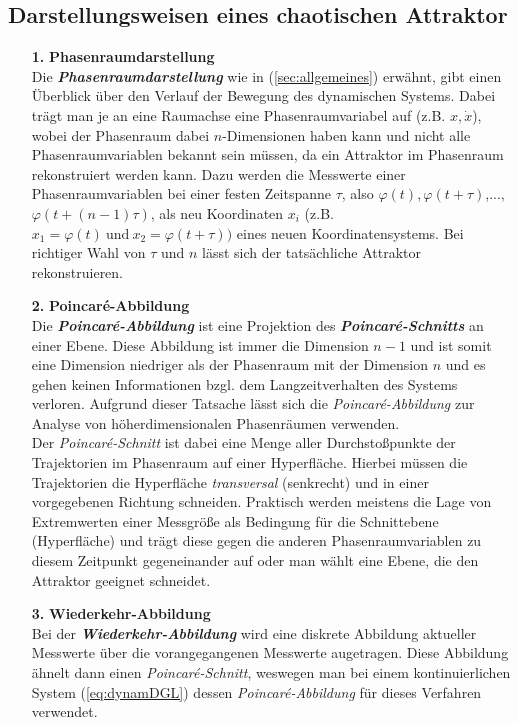 \subsection{Darstellungsweisen eines chaotischen Attraktor}
\label{sub:darstellungAttraktor}
\begin{itemize}
    \item[\textbf{1.}]{\textbf{Phasenraumdarstellung}}\\
    Die \textit{\textbf{Phasenraumdarstellung}} wie in (\ref{sec:allgemeines}) erwähnt, gibt einen Überblick über den Verlauf der Bewegung des dynamischen Systems. Dabei trägt man je an eine Raumachse eine Phasenraumvariabel auf (z.B. $x, \dot{x}$), wobei der Phasenraum dabei $n$-Dimensionen haben kann und nicht alle Phasenraumvariablen bekannt sein müssen, da ein Attraktor im Phasenraum rekonstruiert werden kann. Dazu werden die Messwerte einer Phasenraumvariablen bei einer festen Zeitspanne $\tau$, also $\varphi(t), \varphi(t+\tau)$,..., $\varphi(t+(n-1)\tau)$, als neu Koordinaten $x_i$ (z.B. $x_1=\varphi(t)~\text{und}~x_2=\varphi(t+\tau))$ eines neuen Koordinatensystems. Bei richtiger Wahl von $\tau$ und $n$ lässt sich der tatsächliche Attraktor rekonstruieren. \citep{Lueck}
    \item[\textbf{2.}]{\textbf{Poincar\'e-Abbildung}}\\
    Die \textit{\textbf{Poincar\'e-Abbildung}} ist eine Projektion des \textit{\textbf{Poincar\'e-Schnitts}} an einer Ebene. Diese Abbildung ist immer die Dimension $n-1$ und ist somit eine Dimension niedriger als der Phasenraum mit der Dimension $n$ und es gehen keinen Informationen bzgl. dem Langzeitverhalten des Systems verloren. Aufgrund dieser Tatsache lässt sich die \textit{Poincar\'e-Abbildung} zur Analyse von höherdimensionalen Phasenräumen verwenden.\\
    Der \textit{Poincar\'e-Schnitt} ist dabei eine Menge aller Durchstoßpunkte der Trajektorien im Phasenraum auf einer Hyperfläche. Hierbei müssen die Trajektorien die Hyperfläche \textit{transversal} (senkrecht) und in einer vorgegebenen Richtung schneiden. Praktisch werden meistens die Lage von Extremwerten einer Messgröße als Bedingung für die Schnittebene (Hyperfläche) und trägt diese gegen die anderen Phasenraumvariablen zu diesem Zeitpunkt gegeneinander auf oder man wählt eine Ebene, die den Attraktor geeignet schneidet. \citep{Lueck}
    \item[\textbf{3.}]{\textbf{Wiederkehr-Abbildung}}\\
    Bei der \textit{\textbf{Wiederkehr-Abbildung}} wird eine diskrete Abbildung aktueller Messwerte über die vorangegangenen Messwerte augetragen. Diese Abbildung ähnelt dann einen \textit{Poincar\'e-Schnitt}, weswegen man bei einem kontinuierlichen System (\ref{eq:dynamDGL}) dessen \textit{Poincar\'e-Abbildung} für dieses Verfahren verwendet. \citep{Lueck}

\end{itemize}

